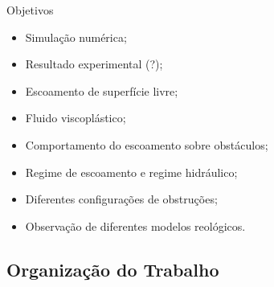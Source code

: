 \begin{frame}{Objetivos}
    \begin{itemize}
        \item Simulação numérica;\pause
        \item Resultado experimental (?);\pause
        \item Escoamento de superfície livre;\pause
        \item Fluido viscoplástico;\pause
        \item Comportamento do escoamento sobre obstáculos;\pause
        \item Regime de escoamento e regime hidráulico; \pause
        \item Diferentes configurações de obstruções;\pause
        \item Observação de diferentes modelos reológicos.
    \end{itemize}
\end{frame}

\subsection{Organização do Trabalho}


